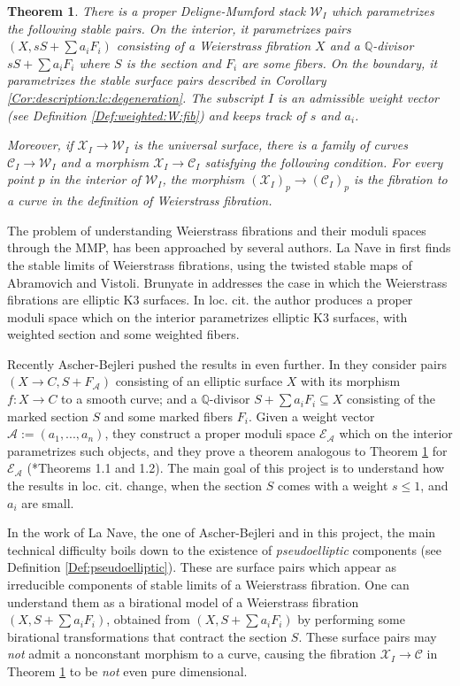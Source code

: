\documentclass[11pt]{amsart}
\newcommand{\cE}{\mathcal{W}}
\newcommand{\sC}{\mathscr{C}}
\newcommand{\sX}{\mathscr{X}}
\newtheorem{Teo}[theorem]{Theorem}
\theoremstyle{definition}
\begin{document}
\begin{Teo}\label{Teo:intro:there:is:a:mod:space}
There is a proper Deligne-Mumford stack $\cE_I$ which parametrizes the following stable pairs. On the interior, it parametrizes pairs $(X,sS+\sum a_i F_i)$ consisting of a Weierstrass fibration $X$ and a $\mathbb{Q}$-divisor $sS+\sum a_i F_i$ where $S$ is the section and $F_i$ are some fibers. On the boundary, it parametrizes the stable surface pairs described in Corollary \ref{Cor:description:lc:degeneration}. The subscript $I$ is an admissible weight vector (see Definition \ref{Def:weighted:W:fib}) and keeps track of $s$ and $a_i$.

Moreover, if $\sX_I \to \cE_I$ is the universal surface, there is a family of curves $\sC_I \to \cE_I$ and a morphism $\sX_I \to \sC_I$ satisfying the following condition. For every point $p$ in the interior of $\cE_I$, the morphism $(\sX_I)_p \to (\sC_I)_p$ is the fibration to a curve in the definition of Weierstrass fibration. 
\end{Teo}
The problem of understanding Weierstrass fibrations and their moduli spaces through the MMP, has been approached by several authors. La Nave in \cite{LaNave} first finds the stable limits of Weierstrass fibrations, using the twisted stable maps of Abramovich and Vistoli. Brunyate in  \cite{brunyate2015modular} addresses
the case in which the Weierstrass fibrations are elliptic K3 surfaces. In loc. cit. the author produces a proper moduli space which on the interior parametrizes elliptic K3 surfaces, with weighted section and some weighted fibers. 

Recently Ascher-Bejleri pushed the results in \cite{LaNave} even further. In \cite{AB3} they consider pairs $(X \to C,S+F_{\mathcal{A}})$
consisting of an elliptic surface $X$ with its morphism $f:X \to C$ to a smooth curve;
and a $\mathbb{Q}$-divisor $S+\sum a_i F_i \subseteq X$ consisting of the marked section
$S$ and some marked fibers $F_i$.
Given a weight vector $\mathcal{A}:=(a_1,...,a_n)$, they
construct a proper moduli space $\mathcal{E}_\mathcal{A}$ which on the interior parametrizes such objects, and they prove a theorem analogous to Theorem \ref{Teo:intro:there:is:a:mod:space} for $\mathcal{E}_\mathcal{A}$ (\cite{AB3}*{Theorems 1.1 and 1.2}). The main goal of this project is to understand how the results in loc. cit. change, when the section $S$ comes with a weight $s \le 1$, and $a_i$ are small.

In the work of La Nave, the one of Ascher-Bejleri and in this project, the main technical difficulty boils down to the existence of \emph{pseudoelliptic} components (see Definition \ref{Def:pseudoelliptic}). These are surface pairs which appear as irreducible components of stable limits of a Weierstrass fibration. One can understand them as a birational model of a Weierstrass fibration $(X,S+\sum a_i F_i)$, obtained from $(X,S+\sum a_i F_i)$ by performing some birational transformations that contract the section $S$. These surface pairs may \emph{not} admit a nonconstant morphism to a curve, causing the fibration $\sX_I \to \sC$ in Theorem \ref{Teo:intro:there:is:a:mod:space} to be \emph{not} even pure dimensional.
\end{document}
